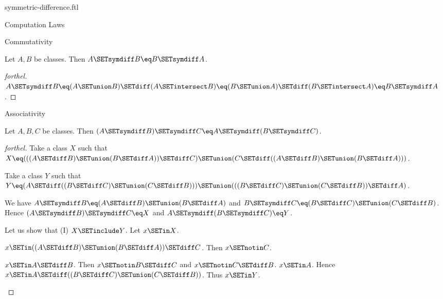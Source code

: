 \documentclass{stex}
\begin{document}
\begin{smodule}{symmetric-difference.ftl}
\begin{sfragment}{Computation Laws}
  \begin{sfragment}{Commutativity}
    \begin{proposition}[forthel,id=FOUNDATIONS_03_4518372049944576]
      Let $A, B$ be classes.
      Then $A \SETsymdiff B \eq B \SETsymdiff A$.
    \end{proposition}
    \begin{proof}[forthel]
      $A \SETsymdiff B
        \eq (A \SETunion B) \SETdiff (A \SETintersect B)
        \eq (B \SETunion A) \SETdiff (B \SETintersect A)
        \eq B \SETsymdiff A$.
    \end{proof}
  \end{sfragment}

  \begin{sfragment}{Associativity}
    \begin{proposition}[forthel,id=FOUNDATIONS_03_8680845204258816]
      Let $A, B, C$ be classes.
      Then $(A \SETsymdiff B) \SETsymdiff C \eq A \SETsymdiff (B \SETsymdiff C)$.
    \end{proposition}
    \begin{proof}[forthel]
      Take a class $X$ such that $X \eq (((A \SETdiff B) \SETunion (B \SETdiff A)) \SETdiff C) \SETunion (C \SETdiff ((A \SETdiff B) \SETunion (B \SETdiff A)))$.

      Take a class $Y$ such that $Y \eq (A \SETdiff ((B \SETdiff C) \SETunion (C \SETdiff B))) \SETunion (((B \SETdiff C) \SETunion (C \SETdiff B)) \SETdiff A)$.

      We have $A \SETsymdiff B \eq (A \SETdiff B) \SETunion (B \SETdiff A)$ and $B \SETsymdiff C \eq (B \SETdiff C) \SETunion (C \SETdiff B)$.
      Hence $(A \SETsymdiff B) \SETsymdiff C \eq X$ and $A \SETsymdiff (B \SETsymdiff C) \eq Y$.

      Let us show that (I) $X \SETinclude Y$.
        Let $x \SETin X$.

        \begin{case}{$x \SETin ((A \SETdiff B) \SETunion (B \SETdiff A)) \SETdiff C$.}
          Then $x \SETnotin C$.

          \begin{case}{$x \SETin A \SETdiff B$.}
            Then $x \SETnotin B \SETdiff C$ and $x \SETnotin C \SETdiff B$. $x \SETin A$.
            Hence $x \SETin A \SETdiff ((B \SETdiff C) \SETunion (C \SETdiff B))$.
            Thus $x \SETin Y$.
          \end{case}


\end{case}
\end{proof}
\end{sfragment}
\end{sfragment}
\end{smodule}
\end{document}
